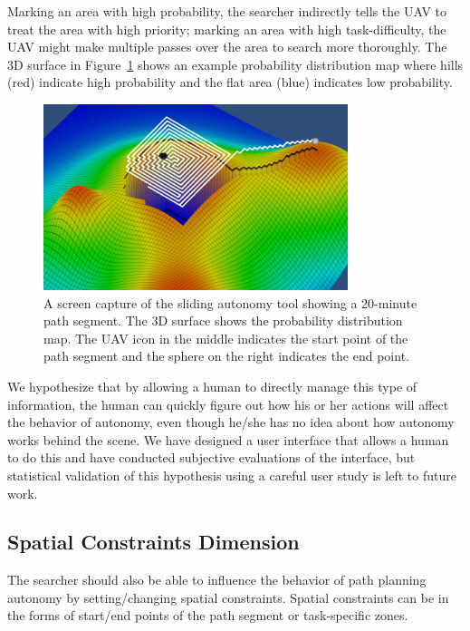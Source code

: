\documentclass[lettersize, apacite, twoside, HRI]{apa_HRI}
\begin{document}
Marking an area with high probability, the searcher indirectly tells the UAV to treat the area with high priority; marking an area with high task-difficulty, the UAV might make multiple passes over the area to search more thoroughly. The 3D surface in Figure~\ref{dimensions6} shows an example probability distribution map where hills (red) indicate high probability and the flat area (blue) indicates low probability.

\begin{figure}
\centering
\includegraphics[width=3.5in]{Dimensions.JPG}
\caption{A screen capture of the sliding autonomy tool showing a 20-minute path segment. The 3D surface shows the probability distribution map. The UAV icon in the middle indicates the start point of the path segment and the sphere on the right indicates the end point.}
\label{dimensions6}
\end{figure}

We hypothesize that by allowing a human to directly manage this type of information, the human can quickly figure out how his or her actions will affect the behavior of autonomy, even though he/she has no idea about how autonomy works behind the scene. We have designed a user interface that allows a human to do this and have conducted subjective evaluations of the interface, but statistical validation of this hypothesis using a careful user study is left to future work.

\subsection{Spatial Constraints Dimension}

The searcher should also be able to influence the behavior of path planning autonomy by setting/changing spatial constraints. Spatial constraints can be in the forms of start/end points of the path segment or task-specific zones.
\end{document}
